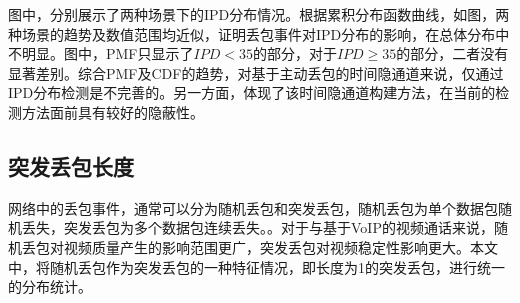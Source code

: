 
图中，分别展示了两种场景下的IPD分布情况。根据累积分布函数曲线，如图，两种场景的趋势及数值范围均近似，证明丢包事件对IPD分布的影响，在总体分布中不明显。图中，PMF只显示了$IPD<35$的部分，对于$IPD \geq 35$的部分，二者没有显著差别。综合PMF及CDF的趋势，对基于主动丢包的时间隐通道来说，仅通过IPD分布检测是不完善的。另一方面，体现了该时间隐通道构建方法，在当前的检测方法面前具有较好的隐蔽性。

\subsection{突发丢包长度}
\label{chap:analyze:results:burst}

网络中的丢包事件，通常可以分为随机丢包和突发丢包，随机丢包为单个数据包随机丢失，突发丢包为多个数据包连续丢失。。对于与基于VoIP的视频通话来说，随机丢包对视频质量产生的影响范围更广，突发丢包对视频稳定性影响更大。本文中，将随机丢包作为突发丢包的一种特征情况，即长度为1的突发丢包，进行统一的分布统计。

